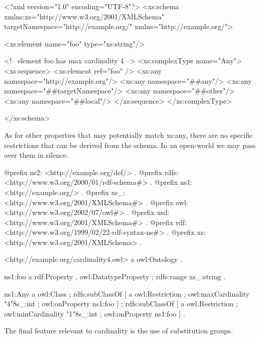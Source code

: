 \begin{DoxyCodeInclude}
<?xml version="1.0" encoding="UTF-8"?>
<xs:schema xmlns:xs="http://www.w3.org/2001/XMLSchema" 
        targetNamespace="http://example.org/" xmlns="http://example.org/">
        
        <xs:element name="foo" type="xs:string"/>

        <!-- element foo has max cardinality 4 -->
        <xs:complexType name="Any">
                <xs:sequence>
                        <xs:element ref="foo" />
                        <xs:any namespace="http://example.org"/>
                        <xs:any namespace="##any"/>
                        <xs:any namespace="##targetNamespace"/>
                        <xs:any namespace="##other"/>
                        <xs:any namespace="##local"/>
                </xs:sequence>
        </xs:complexType>
        
</xs:schema>
\end{DoxyCodeInclude}


As for other properties that may potentially match xs:any, there are no specific restrictions that can be derived from the schema. In an open-\/world we may pass over them in silence.


\begin{DoxyCodeInclude}
@prefix ns2:     <http://example.org/def/> .
@prefix rdfs:    <http://www.w3.org/2000/01/rdf-schema#> .
@prefix ns1:     <http://example.org/> .
@prefix xs_:     <http://www.w3.org/2001/XMLSchema#> .
@prefix owl:     <http://www.w3.org/2002/07/owl#> .
@prefix xsd:     <http://www.w3.org/2001/XMLSchema#> .
@prefix rdf:     <http://www.w3.org/1999/02/22-rdf-syntax-ns#> .
@prefix xs:      <http://www.w3.org/2001/XMLSchema> .

<http://example.org/cardinality4.owl>
      a       owl:Ontology .

ns1:foo
      a       rdf:Property , owl:DatatypeProperty ;
      rdfs:range xs_:string .

ns1:Any
      a       owl:Class ;
      rdfs:subClassOf
              [ a       owl:Restriction ;
                owl:maxCardinality "4"^^xs_:int ;
                owl:onProperty ns1:foo
              ] ;
      rdfs:subClassOf
              [ a       owl:Restriction ;
                owl:minCardinality "1"^^xs_:int ;
                owl:onProperty ns1:foo
              ] .
\end{DoxyCodeInclude}


The final feature relevant to cardinality is the use of substitution groups.


